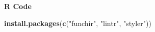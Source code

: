 \documentclass[
]{book}
\newenvironment{Shaded}{\begin{snugshade}}{\end{snugshade}}
\newcommand{\KeywordTok}[1]{\textcolor[rgb]{0.13,0.29,0.53}{\textbf{#1}}}
\newcommand{\NormalTok}[1]{#1}
\newcommand{\StringTok}[1]{\textcolor[rgb]{0.31,0.60,0.02}{#1}}
\begin{document}
\textbf{R Code}

\begin{Shaded}
\begin{Highlighting}[]
\KeywordTok{install.packages}\NormalTok{(}\KeywordTok{c}\NormalTok{(}\StringTok{"funchir"}\NormalTok{, }\StringTok{"lintr"}\NormalTok{, }\StringTok{"styler"}\NormalTok{))}
\end{Highlighting}
\end{Shaded}

  
\end{document}
